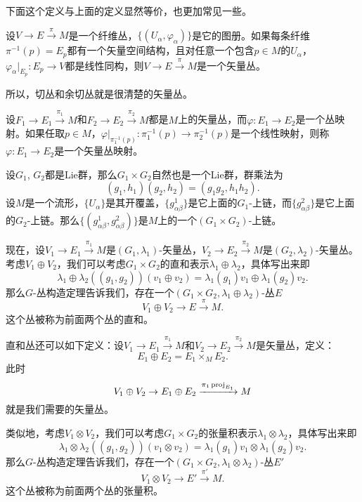 下面这个定义与上面的定义显然等价，也更加常见一些。

\begin{pro}
设$V\to E\xrightarrow{\pi} M$是一个纤维丛，$\{(U_\alpha,\varphi_\alpha)\}$是它的图册。如果每条纤维$\pi^{-1}(p)=E_p$都有一个矢量空间结构，且对任意一个包含$p\in M$的$U_\alpha$，$\varphi_{\alpha}|_{E_p}:E_p\to V$都是线性同构，则$V\to E\xrightarrow{\pi} M$是一个矢量丛。
\end{pro}

所以，切丛和余切丛就是很清楚的矢量丛。

\begin{para}[矢量丛映射]
设$F_1\to E_1\xrightarrow{\pi_1} M$和$F_2\to E_2\xrightarrow{\pi_2} M$都是$M$上的矢量丛，而$\varphi:E_1\to E_2$是一个丛映射。如果任取$p\in M$，$\varphi|_{\pi_1^{-1}(p)}:\pi_1^{-1}(p)\to \pi_2^{-1}(p)$是一个线性映射，则称$\varphi:E_1\to E_2$是一个矢量丛映射。
\end{para}

\begin{para}[矢量丛的直和与张量积]
设$G_1$, $G_2$都是Lie群，那么$G_1\times G_2$自然也是一个Lie群，群乘法为
\[
	(g_1,h_1)(g_2,h_2)=(g_1g_2,h_1h_2).
\]
设$M$是一个流形，$\{U_\alpha\}$是其开覆盖，$\{g^1_{\alpha\beta}\}$是它上面的$G_1$-上链，而$\{g^2_{\alpha\beta}\}$是它上面的$G_2$-上链。那么$\{(g^1_{\alpha\beta},g^2_{\alpha\beta})\}$是$M$上的一个$(G_1\times G_2)$-上链。

现在，设$V_1\to E_1\xrightarrow{\pi_1}M$是$(G_1,\lambda_1)$-矢量丛，$V_2\to E_2\xrightarrow{\pi_2}M$是$(G_2,\lambda_2)$-矢量丛。考虑$V_1\oplus V_2$，我们可以考虑$G_1\times G_2$的直和表示$\lambda_1\oplus \lambda_2$，具体写出来即
\[
	\lambda_1\oplus \lambda_2((g_1,g_2))(v_1\oplus v_2)=\lambda_1(g_1)v_1\oplus \lambda_1(g_2)v_2.
\]
那么$G$-丛构造定理告诉我们，存在一个$(G_1\times G_2,\lambda_1\oplus \lambda_2)$-丛$E$
\[
	V_1\oplus V_2\to E\xrightarrow{\pi} M.
\]
这个丛被称为前面两个丛的直和。

直和丛还可以如下定义：设$V_1\to E_1\xrightarrow{\pi_1}M$和$V_2\to E_2\xrightarrow{\pi_2}M$是矢量丛，定义：
\[
	E_1\oplus E_2 = E_1\times_M E_2.
\]
此时
\[
	V_1\oplus V_2\to E_1\oplus E_2\xrightarrow{\pi_1\operatorname{proj}_{E_1}} M
\]
就是我们需要的矢量丛。


类似地，考虑$V_1\otimes V_2$，我们可以考虑$G_1\times G_2$的张量积表示$\lambda_1\otimes \lambda_2$，具体写出来即
\[
	\lambda_1\otimes \lambda_2((g_1,g_2))(v_1\otimes v_2)=\lambda_1(g_1)v_1\otimes \lambda_1(g_2)v_2.
\]
那么$G$-丛构造定理告诉我们，存在一个$(G_1\times G_2,\lambda_1\otimes \lambda_2)$-丛$E'$
\[
	V_1\otimes V_2\to E'\xrightarrow{\pi'} M.
\]
这个丛被称为前面两个丛的张量积。
\end{para}

